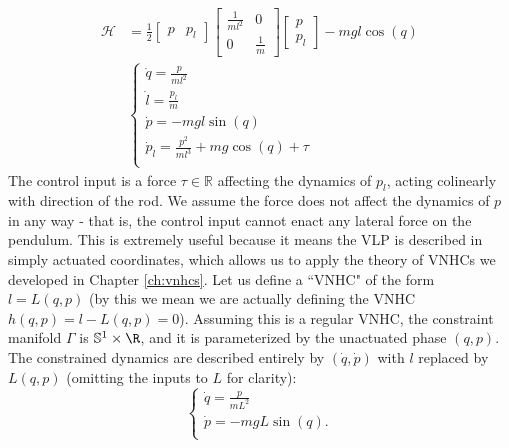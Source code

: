\begin{align}\label{eqn:vlp-hamiltonian-with-pl}
   \mathcal{H} &= \frac{1}{2} \begin{bmatrix} p & p_l \end{bmatrix}
      \begin{bmatrix}
         \frac{1}{ml^2}  & 0 \\
         0 & \frac{1}{m}
      \end{bmatrix} \begin{bmatrix} p \\ p_l \end{bmatrix} - mgl\cos(q) \\
     &\begin{cases}
        \dot{q} = \frac{p}{ml^2} \\
        \dot{l} = \frac{p_l}{m} \\
        \dot{p} = -mgl\sin(q) \\
        \dot{p}_l = \frac{p^2}{ml^3} + mg\cos(q) + \tau \\
   \end{cases} \nonumber
\end{align}
The control input is a force \(\tau \in \mathbb{R}\) affecting the dynamics of
\(p_l\), acting colinearly with direction of the rod.
We assume the force does not affect the dynamics of \(p\) in any way -
that is, the control input cannot enact any lateral force on the pendulum.
This is extremely useful because it means the VLP is described in simply
actuated coordinates, which allows us to apply the theory of VNHCs we
developed in Chapter \ref{ch:vnhcs}.
Let us define a ``VNHC" of the form \(l = L(q,p)\) (by this we mean we are
actually defining the VNHC \(h(q,p) = l - L(q,p) = 0\)).
Assuming this is a regular VNHC, the constraint manifold \(\Gamma\) is
\(\mathbb{S}^1 \times \R\), and it is parameterized by the unactuated phase
\((q,p)\).
The constrained dynamics are described entirely by
\((\dot{q},\dot{p})\) with \(l\) replaced by \(L(q,p)\) (omitting the inputs to
\(L\) for clarity):
\begin{equation}\label{eqn:vlp-dynamics}
   \begin{cases}
      \dot{q} = \frac{p}{m L^2} \\
      \dot{p} = -mgL\sin(q)
      . \\
   \end{cases}
\end{equation}

